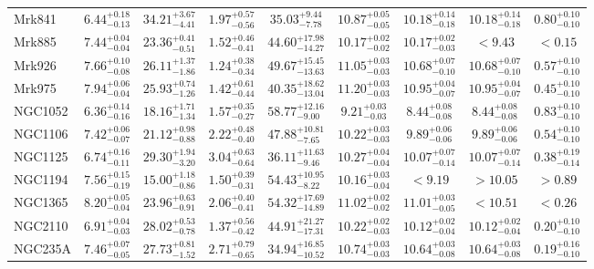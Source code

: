 \documentclass[onecolumn]{mn2e}
\begin{document}
{\begin{center}
\begin{longtable}{lcccccccc}
Mrk841 & $6.44_{-0.13}^{+0.18}$ & $34.21_{-4.41}^{+3.67}$ & $1.97_{-0.56}^{+0.57}$ &$35.03_{-7.78}^{+9.44}$ & $10.87_{-0.05}^{+0.05}$ & $10.18_{-0.18}^{+0.14}$ & $10.18_{-0.18}^{+0.14}$ & $0.80_{-0.10}^{+0.10}$ \\
Mrk885 & $7.44_{-0.04}^{+0.04}$ & $23.36_{-0.51}^{+0.41}$ & $1.52_{-0.41}^{+0.46}$ &$44.60_{-14.27}^{+17.98}$ & $10.17_{-0.02}^{+0.02}$ & $10.17_{-0.03}^{+0.02}$ & $<9.43$ & $<0.15$ \\
Mrk926 & $7.66_{-0.08}^{+0.10}$ & $26.11_{-1.86}^{+1.37}$ & $1.24_{-0.34}^{+0.38}$ &$49.67_{-13.63}^{+15.45}$ & $11.05_{-0.03}^{+0.03}$ & $10.68_{-0.10}^{+0.07}$ & $10.68_{-0.10}^{+0.07}$ & $0.57_{-0.10}^{+0.10}$ \\
Mrk975 & $7.94_{-0.04}^{+0.06}$ & $25.93_{-1.26}^{+0.74}$ & $1.42_{-0.44}^{+0.61}$ &$40.35_{-13.04}^{+18.62}$ & $11.20_{-0.03}^{+0.03}$ & $10.95_{-0.07}^{+0.04}$ & $10.95_{-0.07}^{+0.04}$ & $0.45_{-0.10}^{+0.10}$ \\
NGC1052 & $6.36_{-0.16}^{+0.14}$ & $18.16_{-1.34}^{+1.71}$ & $1.57_{-0.27}^{+0.35}$ &$58.77_{-9.00}^{+12.16}$ & $9.21_{-0.03}^{+0.03}$ & $8.44_{-0.08}^{+0.08}$ & $8.44_{-0.08}^{+0.08}$ & $0.83_{-0.10}^{+0.10}$ \\
NGC1106 & $7.42_{-0.07}^{+0.06}$ & $21.12_{-0.88}^{+0.98}$ & $2.22_{-0.40}^{+0.48}$ &$47.88_{-7.65}^{+10.81}$ & $10.22_{-0.03}^{+0.03}$ & $9.89_{-0.06}^{+0.06}$ & $9.89_{-0.06}^{+0.06}$ & $0.54_{-0.10}^{+0.10}$ \\
NGC1125 & $6.74_{-0.11}^{+0.16}$ & $29.30_{-3.20}^{+1.94}$ & $3.04_{-0.64}^{+0.63}$ &$36.11_{-9.46}^{+11.63}$ & $10.27_{-0.04}^{+0.04}$ & $10.07_{-0.14}^{+0.07}$ & $10.07_{-0.14}^{+0.07}$ & $0.38_{-0.14}^{+0.19}$ \\
NGC1194 & $7.56_{-0.19}^{+0.15}$ & $15.00_{-0.86}^{+1.18}$ & $1.50_{-0.31}^{+0.39}$ &$54.43_{-8.22}^{+10.95}$ & $10.16_{-0.04}^{+0.03}$ & $<9.19$ & $>10.05$ & $>0.89$ \\
NGC1365 & $8.20_{-0.04}^{+0.05}$ & $23.96_{-0.91}^{+0.63}$ & $2.06_{-0.41}^{+0.40}$ &$54.32_{-14.89}^{+17.69}$ & $11.02_{-0.02}^{+0.02}$ & $11.01_{-0.05}^{+0.03}$ & $<10.51$ & $<0.26$ \\
NGC2110 & $6.91_{-0.03}^{+0.04}$ & $28.02_{-0.78}^{+0.53}$ & $1.37_{-0.42}^{+0.56}$ &$44.91_{-17.31}^{+21.27}$ & $10.22_{-0.03}^{+0.02}$ & $10.12_{-0.04}^{+0.02}$ & $10.12_{-0.04}^{+0.02}$ & $0.20_{-0.10}^{+0.10}$ \\
NGC235A & $7.46_{-0.05}^{+0.07}$ & $27.73_{-1.52}^{+0.81}$ & $2.71_{-0.65}^{+0.79}$ &$34.94_{-10.52}^{+16.85}$ & $10.74_{-0.03}^{+0.03}$ & $10.64_{-0.08}^{+0.03}$ & $10.64_{-0.08}^{+0.03}$ & $0.19_{-0.10}^{+0.16}$ \\

\end{longtable}
\end{center}}
\end{document}
